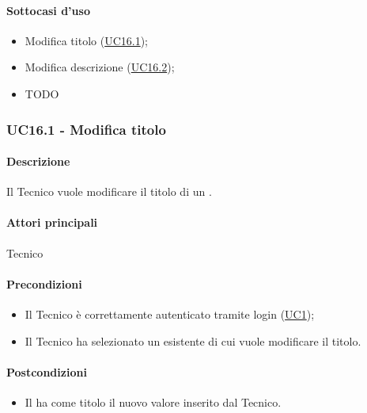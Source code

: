 \paragraph*{Sottocasi d'uso}
\begin{itemize}
  \item Modifica titolo  (\hyperref[UC16point1]{UC16.1});
  \item Modifica descrizione  (\hyperref[UC16point2]{UC16.2});
  \item TODO
\end{itemize}


\subsubsection{UC16.1 - Modifica titolo }\label{UC16point1}
\paragraph*{Descrizione}
Il Tecnico vuole modificare il titolo di un .

\paragraph*{Attori principali}
Tecnico

\paragraph*{Precondizioni}
\begin{itemize}
  \item Il Tecnico è correttamente autenticato tramite login (\hyperref[UC1]{UC1});
  \item Il Tecnico ha selezionato un  esistente di cui vuole modificare il titolo.  
\end{itemize}

\paragraph*{Postcondizioni}
\begin{itemize}
  \item Il  ha come titolo il nuovo valore inserito dal Tecnico.
\end{itemize}

